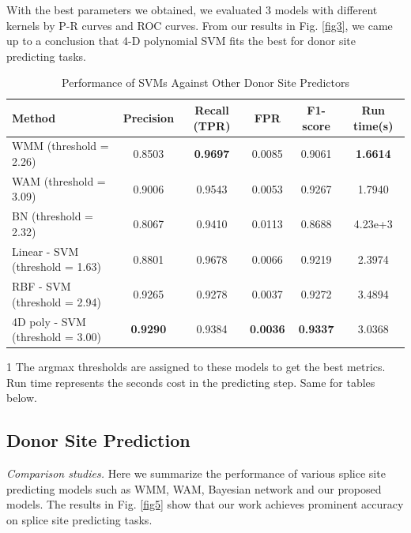 \documentclass[journal,twoside]{IEEEtran}
\begin{document}
With the best parameters we obtained, we evaluated 3 models with different kernels by P-R curves and ROC curves. From our results in Fig. \ref{fig3}, we came up to a conclusion that 4-D polynomial SVM fits the best for donor site predicting tasks.  

\begin{table}[htbp]
\begin{center}
\begin{threeparttable}
\caption{Performance of SVMs Against Other Donor Site Predictors}
\begin{tabular}{lccccc}
\toprule
Method & Precision & Recall (TPR) & FPR & F1-score & Run time(s) \\
\midrule
WMM (threshold = 2.26) & 0.8503 & \textbf{0.9697} & 0.0085 & 0.9061 & \textbf{1.6614} \\
WAM (threshold = 3.09) & 0.9006 & 0.9543 & 0.0053 & 0.9267 & 1.7940 \\
BN (threshold = 2.32) & 0.8067 & 0.9410 & 0.0113 & 0.8688 & 4.23e+3 \\
Linear - SVM (threshold = 1.63) & 0.8801 & 0.9678 & 0.0066 & 0.9219 & 2.3974 \\
RBF - SVM (threshold = 2.94) & 0.9265 & 0.9278 & 0.0037 & 0.9272 & 3.4894 \\
4D poly - SVM (threshold = 3.00) & \textbf{0.9290} & 0.9384 & \textbf{0.0036} & \textbf{0.9337} & 3.0368 \\
\bottomrule
\end{tabular}
\begin{tablenotes}
    \footnotesize
    \item[1] The argmax thresholds are assigned to these models to get the best metrics. Run time represents the seconds cost in the predicting step. Same for tables below. 
\end{tablenotes}
\label{tab2}
\end{threeparttable}
\end{center}
\end{table}

\subsection{Donor Site Prediction}\label{4.2}

\emph{Comparison studies. } Here we summarize the performance of various splice site predicting models such as WMM, WAM, Bayesian network and our proposed models. The results in Fig. \ref{fig5} show that our work achieves prominent accuracy on splice site predicting tasks. 
\end{document}
